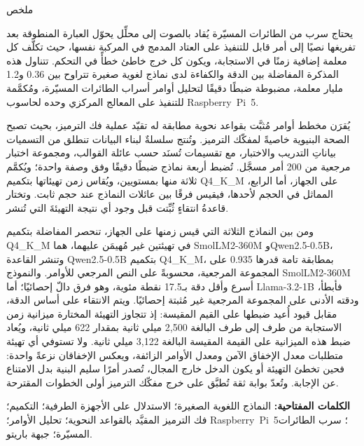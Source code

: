 \thispagestyle{empty}
\vspace*{4cm}
\begin{center}{\Huge\bfseries \begin{Arabic}ملخص\end{Arabic}}\end{center}
\vskip 1cm
\begin{Arabic}
يحتاج سرب من الطائرات المسيّرة يُقاد بالصوت إلى محلِّل يحوّل العبارة المنطوقة بعد تفريغها نصيًا
إلى أمر قابل للتنفيذ على العتاد المدمج في المركبة نفسها، حيث تكلّف كل معلمة إضافية زمنًا في
الاستجابة، ويكون كل خرج خاطئ خطأً في التحكم. تتناول هذه المذكرة المفاضلة بين الدقة والكفاءة لدى
نماذج لغوية صغيرة تتراوح بين \textenglish{0.36} و\textenglish{1.2} مليار معلمة، مضبوطة ضبطًا
دقيقًا لتحليل أوامر أسراب الطائرات المسيّرة، ومُكمَّمة للتنفيذ على المعالج المركزي وحده لحاسوب
\textenglish{\mbox{Raspberry Pi 5}}.

\vspace{0.3cm}
يُقرَن مخطط أوامر مُثبَّت بقواعد نحوية مطابقة له تقيّد عملية فك الترميز، بحيث تصبح الصحة البنيوية
خاصيةً لمفكّك الترميز. وتُنتج سلسلةٌ لبناء البيانات تنطلق من التسميات بياناتِ التدريب والاختبار، مع
تقسيمات تُسنَد حسب عائلة القوالب، ومجموعة اختبار مرجعية من \textenglish{200} أمر مسجَّل. تُضبط أربعة
نماذج ضبطًا دقيقًا وفق وصفة واحدة؛ ويُكمَّم ثلاثة منها بمستويين، ويُقاس زمن تهيئاتها بتكميم \textenglish{Q4\_K\_M} على الجهاز، أما الرابع،
المماثل في الحجم لأحدها، فيقيس فرقًا بين عائلات النماذج عند حجم ثابت. وتختار قاعدةُ انتقاءٍ ثُبِّتت قبل
وجود أي نتيجة التهيئةَ التي تُنشر.

\vspace{0.3cm}
ومن بين النماذج الثلاثة التي قيس زمنها على الجهاز، تنحصر المفاضلة بتكميم \textenglish{Q4\_K\_M} في
تهيئتين غير مُهيمَن عليهما، هما \textenglish{\mbox{SmolLM2-360M}}
و\textenglish{\mbox{Qwen2.5-0.5B}}، وتنشر القاعدة \textenglish{\mbox{Qwen2.5-0.5B}} بتكميم
\textenglish{Q4\_K\_M}، بمطابقة تامة قدرها \textenglish{0.935} على المجموعة المرجعية، محسوبةً على النص المرجعي
للأوامر. والنموذج
\textenglish{\mbox{SmolLM2-360M}} أسرع وأقل دقة بـ\textenglish{17.5} نقطة مئوية، وهو فرق دالّ إحصائيًا؛ أما
\textenglish{\mbox{Llama-3.2-1B}} فأبطأ، ودقته الأدنى على المجموعة المرجعية غير مُثبتة إحصائيًا. ويتم
الانتقاء على أساس الدقة، مقابل قيود أُعيد ضبطها على القيم المقيسة: إذ تتجاوز التهيئة المختارة ميزانية
زمن الاستجابة من طرف إلى طرف البالغة \textenglish{2{,}500} ميلي ثانية بمقدار \textenglish{622} ميلي
ثانية، ويُعاد ضبط هذه الميزانية على القيمة المقيسة البالغة \textenglish{3{,}122} ميلي ثانية. ولا
تستوفي أي تهيئة متطلبات معدل الإخفاق الآمن ومعدل الأوامر الزائفة، ويعكس الإخفاقان نزعةً واحدة: فحين
تخطئ التهيئة أو يكون الدخل خارج المجال، تُصدر أمرًا سليم البنية بدل الامتناع عن الإجابة. وتُعدّ بوابة ثقة تُطبَّق على خرج مفكّك الترميز أولى الخطوات المقترحة.

\vspace{1cm}
\noindent\textbf{الكلمات المفتاحية:} النماذج اللغوية الصغيرة؛ الاستدلال على الأجهزة الطرفية؛ التكميم؛
فك الترميز المقيَّد بالقواعد النحوية؛ تحليل الأوامر؛ \textenglish{\mbox{Raspberry Pi 5}}؛ سرب الطائرات
المسيّرة؛ جبهة باريتو.
\end{Arabic}
\newpage
